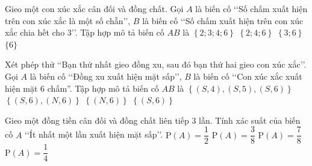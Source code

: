 \begin{ex}%
Gieo một con xúc xắc cân đối và đồng chất. Gọi $A$ là biến cố \lq\lq Số chấm xuất hiện trên con xúc xắc là một số chẵn\rq\rq, $B$ là biến cố \lq\lq Số chấm xuất hiện trên con xúc xắc chia hết cho $3$\rq\rq. Tập hợp mô tả biến cố $AB$ là
	\choice
		{$\left\{2; 3; 4; 6\right\}$}
		{$\left\{2; 4; 6\right\}$}
		{$\left\{3; 6\right\}$}
		{\True $\{6\}$}
\end{ex}
\begin{ex}%
Xét phép thử  \lq\lq Bạn thứ nhất gieo đồng xu, sau đó bạn thứ hai gieo con xúc xắc\rq\rq. Gọi $A$ là biến cố \lq\lq Đồng xu xuất hiện mặt sấp\rq\rq, $B$ là biến cố \lq\lq Con xúc xắc xuất hiện mặt $6$ chấm''. Tập hợp mô tả biến cố $AB$ là
	\choice
		{$\left\{(S, 4),(S, 5),(S, 6)\right\}$}
		{$\left\{(S, 6),(N, 6)\right\}$}
		{$\left\{(N, 6)\right\}$}
		{\True $\left\{(S, 6)\right\}$}
\end{ex}
\begin{ex}%
Gieo một đồng tiền cân đối và đồng chất liên tiếp $3$ lần. Tính xác suất của biến cố $A$ \lq\lq Ít nhất một lần xuất hiện mặt sấp\rq\rq.
	\choice
		{$\mathrm{P}(A)=\dfrac{1}{2}$}
		{$\mathrm{P}(A)=\dfrac{3}{8}$}
		{\True $\mathrm{P}(A)=\dfrac{7}{8}$}
		{$\mathrm{P}(A)=\dfrac{1}{4}$}
\end{ex}
